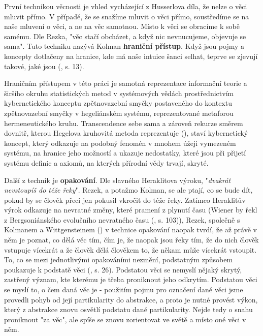 \documentclass[11pt,a4paper]{article}
\begin{document}
První technikou věcnosti je vhled vycházející z Husserlova díla, že nelze o věci mluvit přímo. V případě, že se snažíme mluvit o věci přímo, soustředíme se na naše mluvení o věci, a ne na věc samotnou. Místo k věci se obracíme k sobě samému. Dle Rezka, "věc stačí obcházet, a když nic nevnucujeme, objevuje se sama". Tuto techniku nazývá Kolman \textbf{hraniční přístup}. Když jsou pojmy a koncepty dotlačeny na hranice, kde má naše intuice šanci selhat, teprve se zjevují takové, jaké jsou (\cite{rezek_telo_2010}, s. 13).

Hraničním přístupem v této práci je samotná reprezentace informační teorie a širšího okruhu statistických metod v systémových vědách prostřednictvím kybernetického konceptu zpětnovazební smyčky postaveného do kontextu zpětnovazební smyčky v hegeliánském systému, reprezentované metaforou hermeneutického kruhu. Transcendence sebe sama a zároveň rekurze směrem dovnitř, kterou Hegelova kruhovitá metoda reprezentuje (\cite{kainz_paradox_1988}), staví kybernetický koncept, který odkazuje na podobný fenomén v mnohem úžeji vymezeném systému, na hranice jeho možností a ukazuje nedostatky, které jsou při přijetí systému definic a axiomů, na kterých přírodní vědy trvají, skryté.

Další z technik je \textbf{opakování}. Dle slavného Heraklitova výroku, "\textit{dvakrát nevstoupíš do téže řeky}". Rezek, a potažmo Kolman, se ale ptají, co se bude dít, pokud by se člověk přeci jen pokusil vkročit do téže řeky. Zatímco Heraklitův výrok odkazuje na nevratné změny, které pramení z plynutí času (Wiener by řekl z Bergsoniánského evolučního nevratného času (\cite{wiener_cybernetics_2019}, s. 103)), Rezek, společně s Kolmanem a Wittgensteinem (\cite{wittgenstein_tractatus_2010}) v technice opakování naopak tvrdí, že až právě v něm je poznat, co dělá věc tím, čím je, že naopak jsou řeky tím, že do nich člověk vstupuje vícekrát a že člověk dělá člověkem to, že někam může vícekrát vstoupit. To, co se mezi jednotlivými opakováními nezmění, podstatným způsobem poukazuje k podstatě věci (\cite{rezek_telo_2010}, s. 26). Podstatou věci se nemyslí nějaký skrytý, zastřený význam, kte kterému je třeba proniknout jeho odkrytím. Podstatou věci se myslí to, o čem daná věc je - použitím pojmu pro označení dané věci jsme provedli pohyb od její partikularity do abstrakce, a proto je nutné provést výkon, který z abstrakce znovu osvětlí podstatu dané partikularity. Nejde tedy o snahu proniknout "za věc", ale spíše se znovu zorientovat ve světě a místo oné věci v něm.
\end{document}
